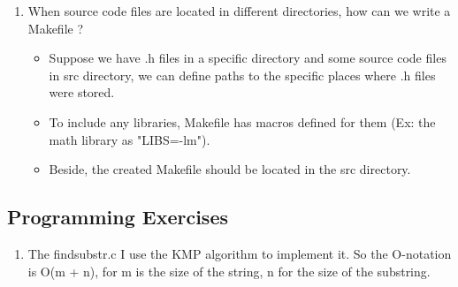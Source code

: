 \documentclass[a4paper]{article}
\begin{document}
\begin{enumerate}
    \item When source code files are located in different directories, how can we write a Makefile ?
    \begin{itemize}
        \item Suppose we have .h files in a specific directory and some source code files in src directory, we can define paths to the specific places where .h files were stored.
        \item To include any libraries, Makefile has macros defined for them (Ex: the math library as "LIBS=-lm").
        \item Beside, the created Makefile should be located in the src directory.
    \end{itemize}
\end{enumerate}

\subsection{Programming Exercises}
\begin{enumerate}
    \item The findsubstr.c I use the KMP algorithm to implement it. So the O-notation is O(m + n), for m is the size of the string, n for the size of the substring.
\end{enumerate}
\end{document}
